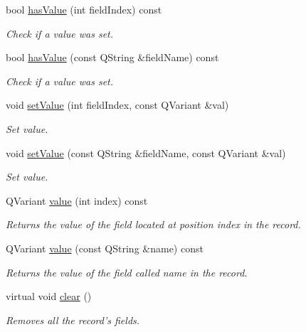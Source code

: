 \begin{DoxyCompactItemize}
bool \hyperlink{classmdt_sql_record_aa0ccfa8ae2bd37d33dbecf8d2bb2cd01}{has\-Value} (int field\-Index) const 
\begin{DoxyCompactList}\small\item\em Check if a value was set. \end{DoxyCompactList}\item 
bool \hyperlink{classmdt_sql_record_a581595f4425f824c794994eb564873cd}{has\-Value} (const Q\-String \&field\-Name) const 
\begin{DoxyCompactList}\small\item\em Check if a value was set. \end{DoxyCompactList}\item 
void \hyperlink{classmdt_sql_record_a330291ff82fb8c7803c47d30f8939ed5}{set\-Value} (int field\-Index, const Q\-Variant \&val)
\begin{DoxyCompactList}\small\item\em Set value. \end{DoxyCompactList}\item 
void \hyperlink{classmdt_sql_record_a8bcaf65b449b6c82548735cdccb8cff1}{set\-Value} (const Q\-String \&field\-Name, const Q\-Variant \&val)
\begin{DoxyCompactList}\small\item\em Set value. \end{DoxyCompactList}\item 
Q\-Variant \hyperlink{classmdt_sql_record_a373eef777b0e51d2e8dc0904f992d609}{value} (int index) const 
\begin{DoxyCompactList}\small\item\em Returns the value of the field located at position index in the record. \end{DoxyCompactList}\item 
Q\-Variant \hyperlink{classmdt_sql_record_abfa14a89fa5e525c57d28f7f93dbcac8}{value} (const Q\-String \&name) const 
\begin{DoxyCompactList}\small\item\em Returns the value of the field called name in the record. \end{DoxyCompactList}\item 
virtual void \hyperlink{classmdt_sql_record_ad1058337837b2891d2e282001ad889d9}{clear} ()
\begin{DoxyCompactList}\small\item\em Removes all the record's fields. \end{DoxyCompactList}\item 

\end{DoxyCompactItemize}
